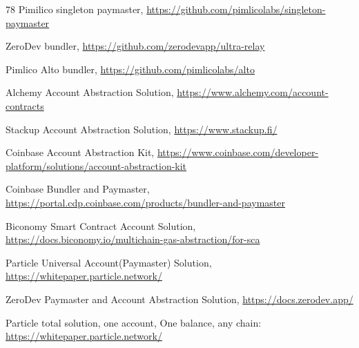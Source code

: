 \documentclass[preprint,12pt]{elsarticle}
\begin{document}
\begin{thebibliography}{78}
Pimilico singleton paymaster,
\url{https://github.com/pimlicolabs/singleton-paymaster}

ZeroDev bundler,
\url{https://github.com/zerodevapp/ultra-relay}

Pimlico Alto bundler,
\url{https://github.com/pimlicolabs/alto}

Alchemy Account Abstraction Solution,
\url{https://www.alchemy.com/account-contracts}

Stackup Account Abstraction Solution,
\url{https://www.stackup.fi/}

Coinbase Account Abstraction Kit,
\url{https://www.coinbase.com/developer-platform/solutions/account-abstraction-kit}

Coinbase Bundler and Paymaster,
\url{https://portal.cdp.coinbase.com/products/bundler-and-paymaster}

Biconomy Smart Contract Account Solution,
\url{https://docs.biconomy.io/multichain-gas-abstraction/for-sca}

Particle Universal Account(Paymaster) Solution,
\url{https://whitepaper.particle.network/}

ZeroDev Paymaster and Account Abstraction Solution,
\url{https://docs.zerodev.app/}

Particle total solution, one account, One balance, any chain:
\url{https://whitepaper.particle.network/}


\end{thebibliography}
\end{document}
